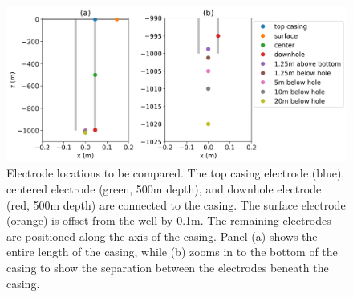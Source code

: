 \begin{figure}
    \begin{center}
    \includegraphics[width=\textwidth]{figures/dc_casing/electrode_location.png}
    \end{center}
\caption{
    Electrode locations to be compared. The top casing electrode (blue),
    centered electrode (green, 500m depth), and downhole electrode (red, 500m depth)
    are connected to the casing. The surface electrode (orange) is offset from the well
    by 0.1m. The remaining electrodes are positioned along the axis of the casing. Panel (a)
    shows the entire length of the casing, while (b) zooms in to the bottom of the casing
    to show the separation between the electrodes beneath the casing.
}
\label{fig:electrode_location}
\end{figure}
